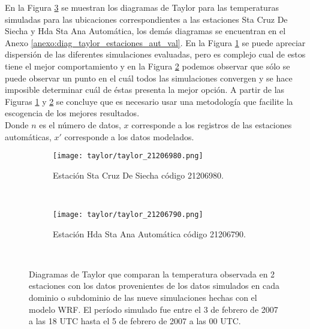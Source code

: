 En la Figura \ref{gra:taylor_total_a} se muestran los diagramas de Taylor para las temperaturas simuladas para las ubicaciones correspondientes a las estaciones Sta Cruz De Siecha y Hda Sta Ana Automática, los demás diagramas se encuentran en el Anexo \ref{anexo:diag_taylor_estaciones_aut_val}. En la Figura \ref{subfig:taylor_11} se puede apreciar dispersión de las diferentes simulaciones evaluadas, pero es complejo cual de estos tiene el mejor comportamiento y en la Figura \ref{subfig:taylor_22} podemos observar que sólo se puede observar un punto en el cuál todos las simulaciones convergen y se hace imposible determinar cuál de éstas presenta la mejor opción. A partir de las Figuras \ref{subfig:taylor_11} y \ref{subfig:taylor_22} se concluye que es necesario usar una metodología que facilite la escogencia de los mejores resultados.\\




%

Donde $n$ es el número de datos, $x$ corresponde a los registros de las estaciones automáticas, $x'$ corresponde a los datos modelados.\\


\begin{figure}[H]
	\begin{center}
	\begin{subfigure}[normla]{0.4\textwidth}
	\caption{Estación Sta Cruz De Siecha código 21206980.}
	\texttt{[image: taylor/taylor\_21206980.png]}
	\label{subfig:taylor_11}
	\end{subfigure}
		~
    \begin{subfigure}[normla]{0.4\textwidth}
    \caption{Estación Hda Sta Ana Automática código 21206790.}
	\texttt{[image: taylor/taylor\_21206790.png]}
	\label{subfig:taylor_22}
	\end{subfigure}
		~
			\end{center}
	\caption{Diagramas de Taylor que comparan la temperatura observada en 2 estaciones con los datos provenientes de los datos simulados en cada dominio o subdominio de las nueve simulaciones hechas con el modelo WRF. El período simulado fue entre el 3 de febrero de 2007 a las 18 UTC hasta el 5 de febrero de 2007 a las 00 UTC.}
	\label{gra:taylor_total_a}	
\end{figure}



